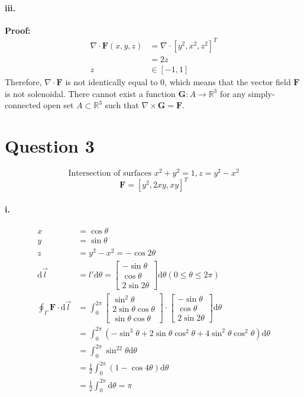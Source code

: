 \documentclass[11pt, a4paper]{article}
\begin{document}
\paragraph{iii.}
\textbf{Proof:}
$$\begin{aligned}
    \nabla \cdot \bm{F}(x,y,z) &= \nabla \cdot [y^2, x^2, z^2]^T \\
    &= 2z \\
    z &\in [-1, 1]
\end{aligned}$$
Therefore, $\nabla \cdot \bm{F}$ is not identically equal to $0$, which means that the vector field $\bm{F}$ is not solenoidal. There cannot exist a function $\bm{G}: A \to \mathbb{R}^3$ for any simply-connected open set $A \subset \mathbb{R}^3$ such that $\nabla \times \bm{G} = \bm{F}$.

\section*{Question 3}
$$\text{Intersection of surfaces }x^2+y^2=1, z=y^2-x^2$$
$$\bm{F}=[y^2,2xy,xy]^T$$

\paragraph{i.}
$$\begin{aligned}
    x &= \cos\theta \\
    y &= \sin\theta \\
    z &= y^2 - x^2 = -\cos2\theta \\
    \mathrm{d}\vec{l} &= l'\mathrm{d}\theta =
    \begin{bmatrix}
        -\sin\theta \\
        \cos\theta \\
        2\sin2\theta
    \end{bmatrix} \mathrm{d}\theta (0 \leq \theta \leq 2\pi)\\
    \oint_\Gamma \bm{F} \cdot \mathrm{d}\vec{l} &= \int_{0}^{2\pi}
    \begin{bmatrix}
        \sin^2\theta \\
        2\sin\theta\cos\theta \\
        \sin\theta\cos\theta
    \end{bmatrix} \cdot
    \begin{bmatrix}
        -\sin\theta \\
        \cos\theta \\
        2\sin2\theta
    \end{bmatrix} \mathrm{d}\theta \\
    &= \int_{0}^{2\pi}(-\sin^3\theta+2\sin\theta\cos^2\theta+4\sin^2\theta\cos^2\theta)\mathrm{d}\theta \\
    &= \int_{0}^{2\pi}\sin^22\theta\mathrm{d}\theta \\
    &= \frac{1}{2}\int_{0}^{2\pi} (1 - \cos4\theta)\mathrm{d}\theta \\
    &= \frac{1}{2}\int_{0}^{2\pi}\mathrm{d}\theta = \pi
\end{aligned}$$
\end{document}
